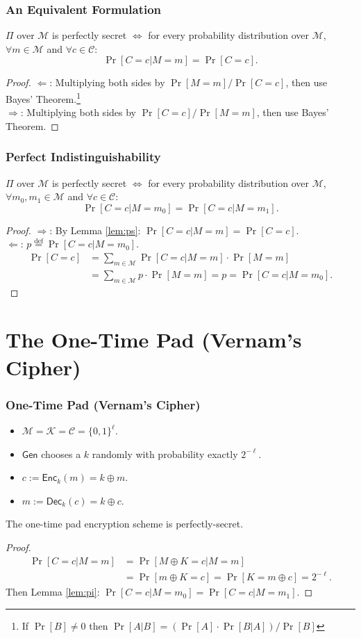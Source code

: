 \begin{frame}\frametitle{An Equivalent Formulation}
\begin{lemma} \label{lem:ps} 
$\Pi$ over $\mathcal{M}$ is perfectly secret $\iff$ for every probability distribution over $\mathcal{M}$, $\forall m \in \mathcal{M}$ and $\forall c \in \mathcal{C}$:
\[ \Pr[C=c | M=m] = \Pr[C=c].\]
\end{lemma}
\begin{proof}
$\Leftarrow$: Multiplying both sides by $\Pr[M=m]/\Pr[C=c]$, then use Bayes' Theorem.\footnote{If $\Pr[B]\neq 0$ then $ \Pr[A|B] = \left( \Pr[A] \cdot \Pr[B|A] \right) / \Pr[B] $} \\
$\Rightarrow$: Multiplying both sides by $\Pr[C=c]/\Pr[M=m]$, then use Bayes' Theorem.
\end{proof}
\end{frame}
\begin{frame}\frametitle{Perfect Indistinguishability}
\begin{lemma}\label{lem:pi}
$\Pi$ over $\mathcal{M}$ is perfectly secret $\iff$ for every probability distribution over $\mathcal{M}$, $\forall m_0, m_1 \in \mathcal{M}$ and $\forall c \in \mathcal{C}$:
\[ \Pr[C=c | M=m_0] = \Pr[C=c | M=m_1].\]
\end{lemma}
\begin{proof}
$\Rightarrow$: By Lemma \ref{lem:ps}: $\Pr[C=c | M=m] = \Pr[C=c]$. \\
$\Leftarrow$: $p \overset{\text{def}}{=} \Pr[C=c | M=m_0]$.
\[
\begin{split}
	\Pr[C=c] &= \sum_{m \in \mathcal{M}} \Pr[C=c|M=m] \cdot \Pr[M=m] \\
	&= \sum_{m \in \mathcal{M}} p \cdot \Pr[M=m] = p = \Pr[C=c|M=m_0].
\end{split}
\]
\end{proof}
\end{frame}
\section{The One-Time Pad (Vernam's Cipher)}
\begin{frame}\frametitle{One-Time Pad (Vernam's Cipher)}
\begin{itemize}
	\item $\mathcal{M} = \mathcal{K} = \mathcal{C} = \{0,1\}^{\ell}$.
	\item $\mathsf{Gen}$ chooses a $k$ randomly with probability exactly $2^{-\ell}$.
	\item $c := \mathsf{Enc}_k(m) = k \oplus m$. 
	\item $m := \mathsf{Dec}_k(c) = k \oplus c$. 
\end{itemize}
\begin{theorem}
The one-time pad encryption scheme is perfectly-secret.
\end{theorem}
\begin{proof}
\[\begin{split} \Pr[C=c|M=m] &= \Pr[M \oplus K=c|M=m] \\
&= \Pr[m \oplus K=c] = \Pr[K = m \oplus c] = 2^{-\ell}.
\end{split}
\]
Then Lemma \ref{lem:pi}: $\Pr[C=c | M=m_0] = \Pr[C=c | M=m_1]$.
\end{proof}
\end{frame}
